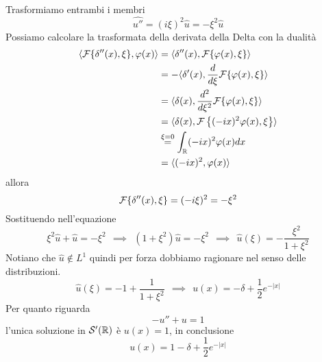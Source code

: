 Trasformiamo entrambi i membri
\begin{equation*}
\widehat{u''} = (i\xi)^{2}\hat{u} = - \xi ^{2}\hat{u}
\end{equation*}
Possiamo calcolare la trasformata della derivata della Delta con la dualità
\begin{align*}
\langle \mathcal{F} \{\delta ''(x) ,\xi \} ,\varphi (x) \rangle  & = \langle \delta ''(x) ,\mathcal{F} \{\varphi (x) ,\xi \} \rangle \\
 & = - \langle \delta '(x) ,\frac{d}{d\xi }\mathcal{F} \{\varphi (x) ,\xi \} \rangle \\
 & = \langle \delta (x) ,\frac{d^{2}}{d\xi ^{2}}\mathcal{F} \{\varphi (x) ,\xi \} \rangle \\
 & = \langle \delta (x) ,\mathcal{F} \left\{(- ix)^{2} \varphi (x) ,\xi \right\} \rangle \\
 & \overset{\xi = 0}{ = }\int _{\mathbb{R} }(- ix)^{2} \varphi (x) dx\\
 & = \langle (- ix)^{2} ,\varphi (x) \rangle 
\end{align*}
allora
\begin{equation*}
\mathcal{F} \{\delta ''(x) ,\xi \} = (- i\xi)^{2} = - \xi ^{2}
\end{equation*}
Sostituendo nell'equazione
\begin{equation*}
\xi ^{2}\hat{u} + \hat{u} = - \xi ^{2} \ \ \implies \ \ \left(1 + \xi ^{2}\right)\hat{u} = - \xi ^{2} \ \ \implies \ \ \hat{u}(\xi) = - \frac{\xi ^{2}}{1 + \xi ^{2}}
\end{equation*}
Notiano che $\hat{u} \notin L^{1}$ quindi per forza dobbiamo ragionare nel senso delle distribuzioni.
\begin{equation*}
\hat{u}(\xi) = - 1 + \frac{1}{1 + \xi ^{2}} \ \ \implies \ \ u(x) = - \delta + \frac{1}{2} e^{ - | x| }
\end{equation*}
Per quanto riguarda
\begin{equation*}
- u'' + u = 1
\end{equation*}
l'unica soluzione in $\mathcal{S}  '(\mathbb{R})$ è $u(x) = 1$, in conclusione
\begin{equation*}
u(x) = 1 - \delta + \frac{1}{2} e^{ - | x| }
\end{equation*}
\Soluzione

